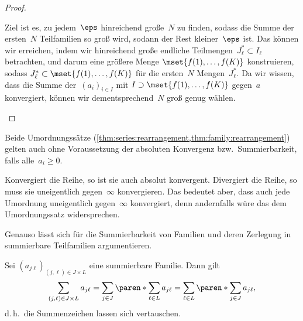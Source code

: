 \documentclass[a4paper]{article}
\begin{document}
\begin{proof}
\begin{enumerate}
{\begin{center}
                  \end{center}
                  Ziel ist es, zu jedem~$\eps$ hinreichend große~$N$ zu finden, sodass die Summe der ersten~$N$ Teilfamilien so groß wird, sodann der Rest kleiner~$\eps$ ist. Das können wir erreichen, indem wir hinreichend große endliche Teilmengen~$J^*_\ell \subset I_\ell$ betrachten, und darum eine größere Menge $\mset{f(1),\dots,f(K)}$ konstruieren, sodass $J^*_\ell \subset \mset{f(1),\dots,f(K)}$ für die ersten~$N$ Mengen~$J^*_\ell$. Da wir wissen, dass die Summe der~$(a_i)_{i\in I}$ mit $I \supset  \mset{f(1),\dots,f(K)}$ gegen~$a$ konvergiert, können wir dementsprechend~$N$ groß genug wählen.
              }\qedhere
    \end{enumerate}
\end{proof}

\begin{remark}
    Beide Umordnungssätze (\cref{thm:series:rearrangement,thm:family:rearrangement}) gelten auch ohne Voraussetzung der absoluten Konvergenz bzw.\ Summierbarkeit, falls alle~$a_i \geq 0$.

    Konvergiert die Reihe, so ist sie auch absolut konvergent. Divergiert die Reihe, so muss sie uneigentlich gegen~$\infty$ konvergieren. Das bedeutet aber, dass auch jede Umordnung uneigentlich gegen~$\infty$ konvergiert, denn andernfalls würe das dem Umordnungssatz widersprechen.

    Genauso lässt sich für die Summierbarkeit von Familien und deren Zerlegung in summierbare Teilfamilien argumentieren.
\end{remark}

\begin{corollary}[Doppelreihensatz]
    Sei $(a_{j\ell})_{(j,\ell)\in J\times L}$ eine summierbare Familie. Dann gilt
    \begin{equation*}
        \sum_{(j,\ell)\in J\times L} a_{j\ell} = \sum_{j\in J} \paren*{\sum_{\ell\in L} a_{j\ell}} = \sum_{\ell\in L} \paren*{\sum_{j\in J} a_{j\ell}},
    \end{equation*}
    d.\,h.\ die Summenzeichen lassen sich vertauschen.
\end{corollary}
\end{document}
